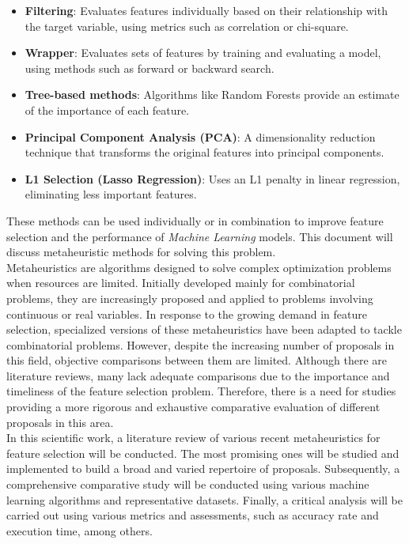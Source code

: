 \begin{itemize}
       \item \textbf{Filtering}: Evaluates features individually based on their relationship with the target variable, using metrics such as correlation or chi-square.
       \item \textbf{Wrapper}: Evaluates sets of features by training and evaluating a model, using methods such as forward or backward search.
       \item \textbf{Tree-based methods}: Algorithms like Random Forests provide an estimate of the importance of each feature.
       \item \textbf{Principal Component Analysis (PCA)}: A dimensionality reduction technique that transforms the original features into principal components.
       \item \textbf{L1 Selection (Lasso Regression)}: Uses an L1 penalty in linear regression, eliminating less important features.
\end{itemize}

These methods can be used individually or in combination to improve feature selection and the performance of \textit{Machine Learning} models. This document will discuss metaheuristic methods for solving this problem.\\[6pt]

Metaheuristics are algorithms designed to solve complex optimization problems when resources are limited. Initially developed mainly for combinatorial problems, they are increasingly proposed and applied to problems involving continuous or real variables. In response to the growing demand in feature selection, specialized versions of these metaheuristics have been adapted to tackle combinatorial problems. However, despite the increasing number of proposals in this field, objective comparisons between them are limited. Although there are literature reviews, many lack adequate comparisons due to the importance and timeliness of the feature selection problem. Therefore, there is a need for studies providing a more rigorous and exhaustive comparative evaluation of different proposals in this area.\\[6pt]

In this scientific work, a literature review of various recent metaheuristics for feature selection will be conducted. The most promising ones will be studied and implemented to build a broad and varied repertoire of proposals. Subsequently, a comprehensive comparative study will be conducted using various machine learning algorithms and representative datasets. Finally, a critical analysis will be carried out using various metrics and assessments, such as accuracy rate and execution time, among others.\\[6pt]

